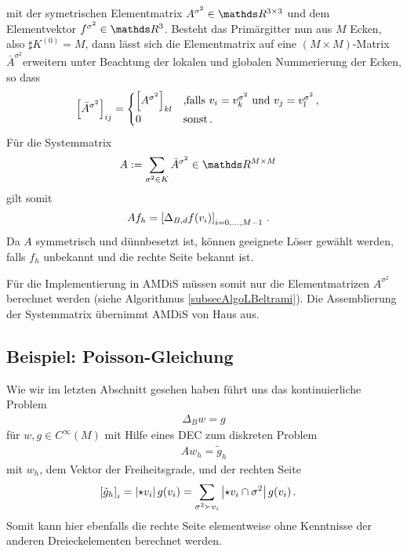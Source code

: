     mit der symetrischen Elementmatrix \( A^{\sigma^{2}} \in \R^{3 \times 3} \) 
    und dem Elementvektor \( f^{\sigma^{2}}\in\R^{3} \).
    Besteht das Primärgitter nun aus \( M \) Ecken, also \( \sharp K^{(0)} = M \),
    dann lässt sich die Elementmatrix auf eine \( (M\times M) \)-Matrix \( \bar{A}^{\sigma^{2}} \)erweitern 
    unter Beachtung
    der lokalen und globalen Nummerierung der Ecken, so dass
    \begin{align}
      \left[ \bar{A}^{\sigma^{2}} \right]_{ij}
        &= 
          \begin{cases}
            \left[ A^{\sigma^{2}} \right]_{kl} & \text{,falls } v_{i} = v^{\sigma^{2}}_{k}
                                                 \text{ und }   v_{j} = v^{\sigma^{2}}_{l} \,\text{,} \\
            0 & \text{sonst} \,\text{.}
          \end{cases}
    \end{align}
    Für die Systemmatrix
    \begin{align}
      A &:= \sum_{\sigma^{2}\in K} \bar{A}^{\sigma^{2}} \in \R^{M\times M}
    \end{align}
    gilt somit
    \begin{align}
      A f_{h} &= \left[ \Delta_{B,d} f(v_{i}) \right]_{i=0,\ldots,M-1} \,\text{.}
    \end{align}
    Da \( A \) symmetrisch und dünnbesetzt ist, können geeignete Löser gewählt werden, 
    falls \( f_{h} \) unbekannt und die rechte Seite bekannt ist.

    Für die Implementierung in AMDiS müssen somit nur die Elementmatrizen \( A^{\sigma^{2}} \) berechnet
    werden (siehe Algorithmus \ref{subsecAlgoLBeltrami}). 
    Die Assemblierung der Systemmatrix übernimmt AMDiS von Haus aus. 
  
  \subsection{Beispiel: Poisson-Gleichung}
    Wie wir im letzten Abschnitt gesehen haben führt uns das kontinuierliche Problem
    \begin{align}
      \Delta_{B} w = g
    \end{align}
    für \( w,g \in C^{\infty}(M) \) mit Hilfe eines DEC zum diskreten Problem
    \begin{align}
      A w_{h} = \tilde{g}_{h}
    \end{align}
    mit \( w_{h} \), dem Vektor der Freiheitsgrade, und der rechten Seite
    \begin{align}
      \left[ \tilde{g}_{h} \right]_{i} &= \left| \star v_{i} \right| g(v_{i})
            = \sum_{\sigma^{2}\succ v_{i}} \left| \star v_{i} \cap \sigma^{2} \right| g(v_{i}) \,\text{.}
    \end{align}
    Somit kann hier ebenfalls die rechte Seite elementweise ohne Kenntnisse der anderen Dreieckelementen
    berechnet werden.
    
